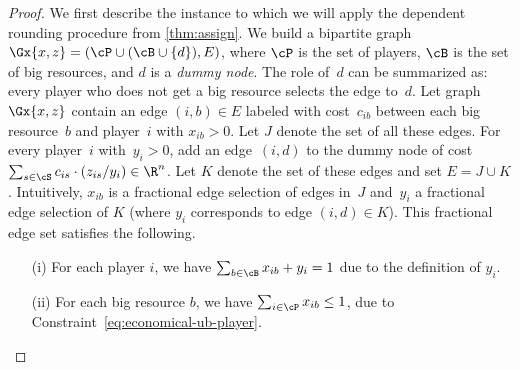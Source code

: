\begin{proof}
We first describe the instance to which we will apply the dependent rounding procedure from \cref{thm:assign}.
We build a bipartite graph $\Gx{x,z} = (\cP\cup (\cB \cup \{d\}), E)$, where $\cP$ is the set of players, $\cB$ is the set of big resources, and $d$ is a \textit{dummy node}. 
The role of~$d$ can be summarized as: every player who does not get a big resource selects
the edge to~$d$. 
Let graph~$\Gx{x,z}$ contain an edge $(i,b) \in E$ labeled with cost~$c_{ib}$ between each big resource~$b$ and player~$i$ with $x_{ib} > 0$. 
Let $J$ denote the set of all these edges. 
For every player~$i$ with~$y_i > 0$, add an edge~$(i, d)$ to the dummy node of cost~$\sum_{s \in \cS} c_{is} \cdot (z_{is}/y_i) \in \R^n$.
Let $K$ denote the set of these edges and
set $E = J\cup K$.
Intuitively, $x_{ib}$ is a fractional edge selection
of edges in~$J$ and~$y_i$ a fractional edge selection of $K$ (where $y_i$ corresponds to edge $(i, d)\in K$).
This fractional edge set satisfies the following.
\smallskip
\begin{enumerate}
    \item[(i)] For each player $i$, we have $\sum_{b \in \cB} x_{ib} + y_i = 1$ due to the definition of $y_i$.
    \item[(ii)] For each big resource $b$, we have $\sum_{i \in \cP} x_{ib} \leq 1$, due to Constraint~\eqref{eq:economical-ub-player}.
\end{enumerate}


\end{proof}
